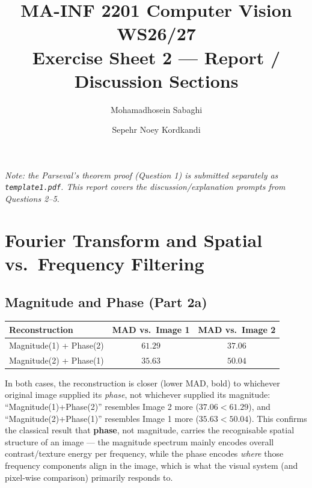 \documentclass[11pt]{article}
\title{MA-INF 2201 Computer Vision WS26/27 \\ Exercise Sheet 2 --- Report / Discussion Sections}
\author{Mohamadhosein Sabaghi \and Sepehr Noey Kordkandi}
\date{}
\begin{document}
\maketitle

\noindent\textit{Note: the Parseval's theorem proof (Question 1) is submitted separately as
\texttt{template1.pdf}. This report covers the discussion/explanation prompts from Questions
2--5.}

\setcounter{section}{1} %

\section{Fourier Transform and Spatial vs.\ Frequency Filtering}

\subsection{Magnitude and Phase (Part 2a)}

\begin{table}[h]
\centering
\begin{tabular}{lcc}
\toprule
Reconstruction & MAD vs.\ Image 1 & MAD vs.\ Image 2 \\
\midrule
Magnitude(1) + Phase(2) & $61.29$ & $\mathbf{37.06}$ \\
Magnitude(2) + Phase(1) & $\mathbf{35.63}$ & $50.04$ \\
\bottomrule
\end{tabular}
\end{table}

In both cases, the reconstruction is closer (lower MAD, bold) to whichever original image
supplied its \emph{phase}, not whichever supplied its magnitude: ``Magnitude(1)+Phase(2)''
resembles Image 2 more ($37.06 < 61.29$), and ``Magnitude(2)+Phase(1)'' resembles Image 1
more ($35.63 < 50.04$). This confirms the classical result that \textbf{phase}, not
magnitude, carries the recognisable spatial structure of an image --- the magnitude
spectrum mainly encodes overall contrast/texture energy per frequency, while the phase
encodes \emph{where} those frequency components align in the image, which is what the
visual system (and pixel-wise comparison) primarily responds to.
\end{document}
